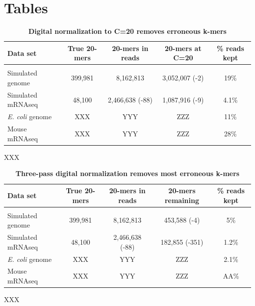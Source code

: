 \documentclass[10pt,draft]{article}
\begin{document}
\section*{Tables}

\begin{table}[!ht]
\caption{
\bf{Digital normalization to C=20 removes erroneous k-mers}}
\begin{tabular}{|l|c|c|c|c|}
Data set & True 20-mers & 20-mers in reads & 20-mers at C=20 & \% reads kept\\
\hline \\
Simulated genome & 399,981 & 8,162,813 & 3,052,007 (-2) & 19\% \\
Simulated mRNAseq & 48,100 & 2,466,638 (-88) & 1,087,916 (-9) & 4.1\% \\
{\em E. coli} genome & XXX & YYY & ZZZ & 11\% \\
Mouse mRNAseq & XXX & YYY & ZZZ & 28\% \\
\end{tabular}
\begin{flushleft} XXX
\end{flushleft}
\label{tab:normC20}
\end{table}

\begin{table}[!ht]
\caption{
\bf{Three-pass digital normalization removes most erroneous k-mers}}
\begin{tabular}{|l|c|c|c|c|}
Data set & True 20-mers & 20-mers in reads & 20-mers remaining & \% reads kept\\
\hline \\
Simulated genome & 399,981 & 8,162,813 & 453,588 (-4) & 5\% \\
Simulated mRNAseq & 48,100 & 2,466,638 (-88) & 182,855 (-351) & 1.2\% \\
{\em E. coli} genome & XXX & YYY & ZZZ & 2.1\% \\
Mouse mRNAseq & XXX & YYY & ZZZ & AA\% \\
\end{tabular}
\begin{flushleft} XXX
\end{flushleft}
\label{tab:normC5}
\end{table}
\end{document}
